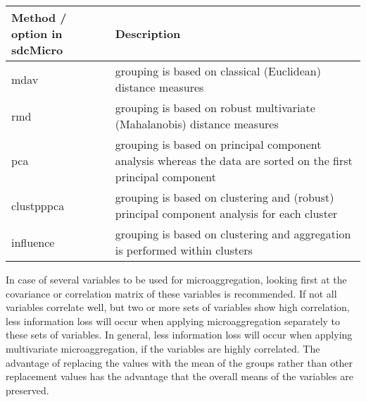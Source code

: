 \documentclass[letterpaper,10pt,english]{sphinxmanual}
\begin{document}
\begin{savenotes}\sphinxattablestart
\centering
{}
\label{\detokenize{anon_methods:tab513}}\label{\detokenize{anon_methods:id40}}
\sphinxaftercaption
\begin{tabulary}{\linewidth}[t]{|T|T|}
\hline
\sphinxstyletheadfamily 
Method / option in sdcMicro
&\sphinxstyletheadfamily 
Description
\\
\hline
mdav
&
grouping is based on classical (Euclidean) distance measures
\\
\hline
rmd
&
grouping is based on robust multivariate (Mahalanobis) distance measures
\\
\hline
pca
&
grouping is based on principal component analysis whereas the data are sorted on the first principal component
\\
\hline
clustpppca
&
grouping is based on clustering and (robust) principal component analysis for each cluster
\\
\hline
influence
&
grouping is based on clustering and aggregation is performed within clusters
\\
\hline
\end{tabulary}
\par
\sphinxattableend\end{savenotes}

In case of several variables to be used for microaggregation, looking
first at the covariance or correlation matrix of these variables is
recommended. If not all variables correlate well, but two or more sets
of variables show high correlation, less information loss will occur
when applying microaggregation separately to these sets of variables. In
general, less information loss will occur when applying multivariate
microaggregation, if the variables are highly correlated. The advantage
of replacing the values with the mean of the groups rather than other
replacement values has the advantage that the overall means of the
variables are preserved.
\end{document}
